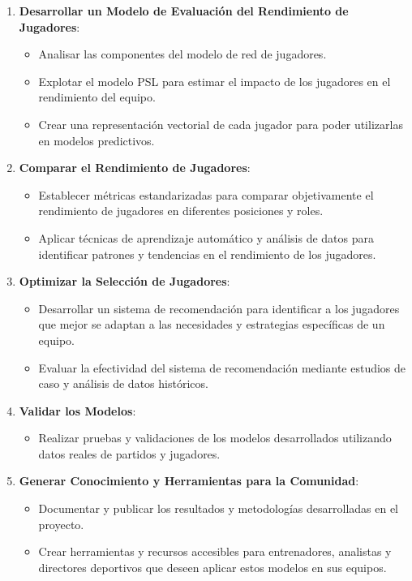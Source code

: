 \documentclass[
  a4paper,
]{article}
\providecommand{\tightlist}{%
  \setlength{\itemsep}{0pt}\setlength{\parskip}{0pt}}
\begin{document}
\begin{enumerate}
\def\labelenumi{\arabic{enumi}.}
\tightlist
\item
  \textbf{Desarrollar un Modelo de Evaluación del Rendimiento de
  Jugadores}:

  \begin{itemize}
  \tightlist
  \item
    Analisar las componentes del modelo de red de jugadores.
  \item
    Explotar el modelo PSL para estimar el impacto de los jugadores en
    el rendimiento del equipo.
  \item
    Crear una representación vectorial de cada jugador para poder
    utilizarlas en modelos predictivos.
  \end{itemize}
\item
  \textbf{Comparar el Rendimiento de Jugadores}:

  \begin{itemize}
  \tightlist
  \item
    Establecer métricas estandarizadas para comparar objetivamente el
    rendimiento de jugadores en diferentes posiciones y roles.
  \item
    Aplicar técnicas de aprendizaje automático y análisis de datos para
    identificar patrones y tendencias en el rendimiento de los
    jugadores.
  \end{itemize}
\item
  \textbf{Optimizar la Selección de Jugadores}:

  \begin{itemize}
  \tightlist
  \item
    Desarrollar un sistema de recomendación para identificar a los
    jugadores que mejor se adaptan a las necesidades y estrategias
    específicas de un equipo.
  \item
    Evaluar la efectividad del sistema de recomendación mediante
    estudios de caso y análisis de datos históricos.
  \end{itemize}
\item
  \textbf{Validar los Modelos}:

  \begin{itemize}
  \tightlist
  \item
    Realizar pruebas y validaciones de los modelos desarrollados
    utilizando datos reales de partidos y jugadores.
  \end{itemize}
\item
  \textbf{Generar Conocimiento y Herramientas para la Comunidad}:

  \begin{itemize}
  \tightlist
  \item
    Documentar y publicar los resultados y metodologías desarrolladas en
    el proyecto.
  \item
    Crear herramientas y recursos accesibles para entrenadores,
    analistas y directores deportivos que deseen aplicar estos modelos
    en sus equipos.
  \end{itemize}
\end{enumerate}
\end{document}
